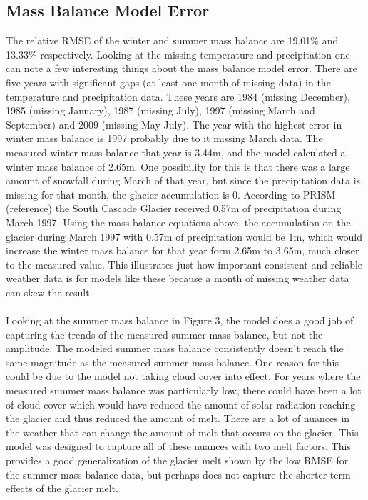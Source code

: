 \documentclass{article}
\begin{document}
\subsection{Mass Balance Model Error}
The relative RMSE of the winter and summer mass balance are 19.01\% and 13.33\% respectively.
Looking at the missing temperature and precipitation one can note a few interesting things about the mass balance model error. There are five years 
with significant gaps (at least one month of missing data) in the temperature and precipitation data. These years are 1984 (missing December), 
1985 (missing January), 1987 (missing July), 1997 (missing March and September) and 2009 (missing May-July). The year with the highest error in 
winter mass balance is 1997 probably due to it missing March data. The measured winter mass balance that year is 3.44m, and the model calculated a 
winter mass balance of 2.65m. One possibility for this is that there was a large amount of snowfall during March of that year, but since the 
precipitation data is missing for that month, the glacier accumulation is 0. According to PRISM (reference) the South Cascade Glacier received 0.57m 
of precipitation during March 1997. Using the mass balance equations above, the accumulation on the glacier during March 1997 with 0.57m of 
precipitation would be 1m, which would increase the winter mass balance for that year form 2.65m to 3.65m, much closer to the measured value. This 
illustrates just how important consistent and reliable weather data is for models like these because a month of missing weather data can skew the 
result.
\paragraph{}
Looking at the summer mass balance in Figure 3, the model does a good job of capturing the trends of the measured summer mass balance, but not 
the amplitude. The modeled summer mass balance consistently doesn't reach the same magnitude as the measured summer mass balance. One reason for this 
could be due to the model not taking cloud cover into effect. For years where the measured summer mass balance was particularly low, there could 
have been a lot of cloud cover which would have reduced the amount of solar radiation reaching the glacier and thus reduced the amount of melt. 
There are a lot of nuances in the weather that can change the amount of melt that occurs on the glacier. This model was designed to capture all of 
these nuances with two melt factors. This provides a good generalization of the glacier melt shown by the low RMSE for the summer mass balance data, 
but perhaps does not capture the shorter term effects of the glacier melt.
\end{document}
